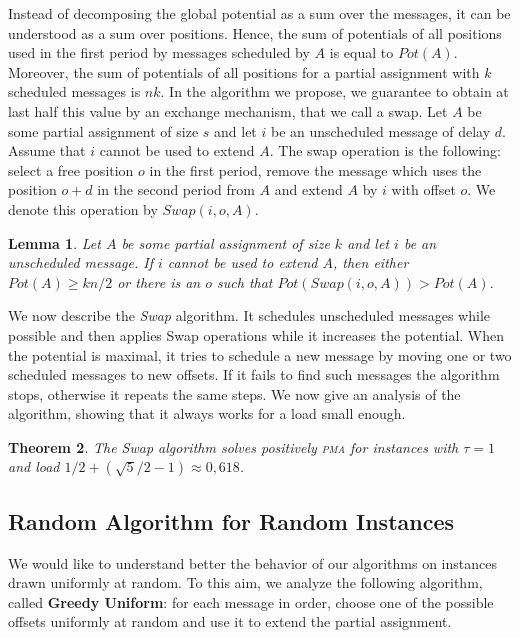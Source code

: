 \documentclass[10pt, conference, letterpaper]{algotel}
\newtheorem{theorem}{Theorem}
\newtheorem{lemma}[theorem]{Lemma}
\newcommand\pma{\textsc{pma}\xspace}
\begin{document}
Instead of decomposing the global potential as a sum over the messages, it can be understood
as a sum over positions. Hence, the sum of potentials of all positions used in the first period by messages scheduled by $A$ is equal to $Pot(A)$.  Moreover, the sum of potentials of all positions for a partial assignment with $k$ scheduled messages is $nk$.  
In the algorithm we propose, we guarantee to obtain at last half this value by an exchange mechanism, that we call a swap. Let $A$ be some partial assignment of size $s$ and let $i$ be an unscheduled message of delay $d$. Assume that $i$ cannot be used to extend $A$. The swap operation is the following: 
select a free position $o$ in the first period, remove the message which uses the position $o+d$ in the second period from $A$ and extend $A$ by $i$ with offset $o$. We denote this operation by $Swap(i,o,A)$.

\begin{lemma}\label{lemma:swap}
Let $A$ be some partial assignment of size $k$ and let $i$ be an unscheduled message. If $i$ cannot be used to extend $A$, then either $Pot(A) \geq kn/2$ or there is an $o$ such that $Pot(Swap(i,o,A)) > Pot(A)$.
\end{lemma}


We now describe the \emph{Swap} algorithm. It schedules unscheduled messages while possible and then applies Swap operations while it increases the potential. When the potential is maximal, it tries to schedule a new message by moving one or two scheduled messages to new offsets. If it fails to find such messages the algorithm stops, otherwise it repeats the same steps. We now give an analysis of the algorithm, showing that it always works for a load small enough.

\begin{theorem}
The Swap algorithm solves positively \pma for instances with $\tau =1$ and load $1/2 + (\sqrt{5}/2 -1) \approx 0,618$.
\end{theorem}

\subsection{Random Algorithm for Random Instances}

We would like to understand better the behavior of our algorithms
on instances drawn uniformly at random. To this aim, we analyze the following algorithm, called \textbf{Greedy Uniform}: for each message in order, choose one of the possible offsets uniformly at random and use it to extend the partial assignment. 
\end{document}
